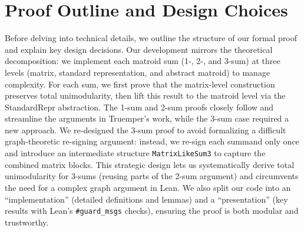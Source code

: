 \section{Proof Outline and Design Choices}
Before delving into technical details, we outline the structure of our formal proof and explain key design decisions. 
Our development mirrors the theoretical decomposition: we implement each matroid sum (1-, 2-, and 3-sum) at three levels (matrix, standard representation, and abstract matroid) to manage complexity. 
For each sum, we first prove that the matrix-level construction preserves total unimodularity, then lift this result to the matroid level via the StandardRepr abstraction. 
The 1-sum and 2-sum proofs closely follow and streamline the arguments in Truemper's work, while the 3-sum case required a new approach. 
We re-designed the 3-sum proof to avoid formalizing a difficult graph-theoretic re-signing argument: instead, we re-sign each summand only once and introduce an intermediate structure \texttt{MatrixLikeSum3} to capture the combined matrix blocks. 
This strategic design lets us systematically derive total unimodularity for 3-sums (reusing parts of the 2-sum argument) and circumvents the need for a complex graph argument in Lean. 
We also split our code into an ``implementation'' (detailed definitions and lemmas) and a “presentation” (key results with Lean's \verb|#guard_msgs| checks), ensuring the proof is both modular and trustworthy.
